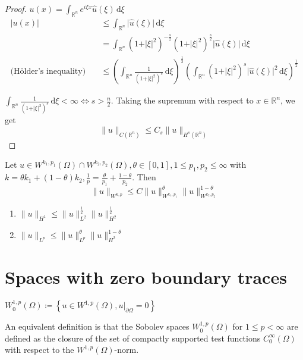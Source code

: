 \documentclass{report}
\begin{document}
\begin{proof}
    \(u(x) = \int_{\mathbb{R}^{n}} e^{i\xi x} \hat{u}(\xi) \,\mathrm{d}\xi \)
    \begin{align*}
        \vert u(x) \vert &\leq \int_{\mathbb{R}^{n}} \vert \hat{u}(\xi) \vert \,\mathrm{d}\xi \\
        &= \int_{\mathbb{R}^{n}} \left(1+\vert \xi \vert ^{2} \right)^{-\frac{s}{2}} \left(1+\vert \xi \vert ^{2} \right)^{\frac{s}{2}} \vert \hat{u}(\xi) \vert \,\mathrm{d}\xi \\
        \text{(Hölder's inequality)} \quad &\leq \left(\int_{\mathbb{R}^{n}} \frac{1}{\left(1+\vert \xi \vert ^{2}  \right)^{s}} \,\mathrm{d}\xi \right)^{\frac{1}{2}} \left(\int_{\mathbb{R}^{n}} \left(1+\vert \xi \vert ^{2} \right)^{s} \vert \hat{u}(\xi) \vert^{2} \,\mathrm{d}\xi \right)^{\frac{1}{2}}
    \end{align*} 

    \(\int_{\mathbb{R}^{n}} \frac{1}{\left(1+\vert \xi \vert ^{2} \right)^{s}} \,\mathrm{d}\xi < \infty \iff s>\frac{n}{2}\).
    Taking the supremum with respect to \(x \in \mathbb{R}^{n}\), we get
    \[\|u\|_{C(\mathbb{R}^{n})} \leq C_{s}\|u\|_{H^{s}(\mathbb{R}^{n})}\]
\end{proof}

{
    Let \(u \in W^{k_1, p_1}(\Omega) \cap W^{k_2, p_2}(\Omega), \theta \in [0,1], 1\leq p_1, p_2 \leq \infty\) with \(k = \theta k_1 + (1-\theta) k_2, \frac{1}{p} = \frac{\theta}{p_1} + \frac{1-\theta}{p_2} \). Then 
    \[
        \|u\|_{W^{k, p}} \leq C\|u\|_{W^{k_1, p_1}}^{\theta} \|u\|_{W^{k_2, p_2}}^{1-\theta}
    \]
}

{
    \begin{enumerate}
        \item \(\|u\|_{H^{1}} \leq \|u\|_{L^{2}}^{\frac{1}{2}} \|u\|_{H^{2}}^{\frac{1}{2}}\)
        \item \(\|u\|_{L^{p}} \leq \|u\|_{L^{p}}^{\theta} \|u\|_{H^{2}}^{1-\theta}\) 
    \end{enumerate}
}

\section{Spaces with zero boundary traces}
\dfn{}
{
    \(W^{1, p}_{0}(\Omega) \coloneqq \left\{u \in W^{1, p}(\Omega), \left. u \right|_{\partial \Omega} = 0\right\} \)

    An equivalent definition is that the Sobolev spaces \(W^{1, p}_{0}(\Omega)\) for \(1 \leq p < \infty\) are defined as the closure of the set of compactly supported test functions \(C_{0}^{\infty}(\Omega)\) with respect to the \(W^{1, p}(\Omega)\)-norm.
}
\end{document}
